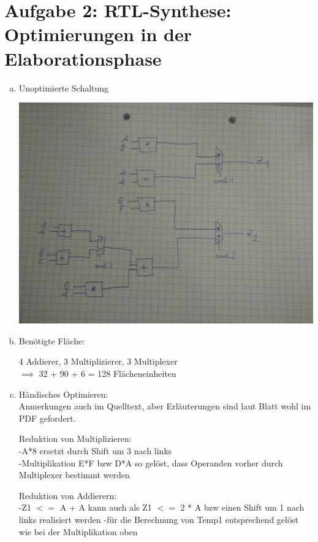 \documentclass[a4paper]{scrartcl}
\begin{document}
	\section*{Aufgabe 2: RTL-Synthese: Optimierungen in der Elaborationsphase}
	
	\begin{enumerate}[(a)]
	\item Unoptimierte Schaltung
	
	\includegraphics[width=\textwidth]{netlist}
	
	\item Benötigte Fläche:
	
	4 Addierer, 3 Multiplizierer, 3 Multiplexer\\
	$\implies$ 32 + 90 + 6 = 128 Flächeneinheiten
	
	\item Händisches Optimieren:\\
	
	Anmerkungen auch im Quelltext, aber Erläuterungen sind laut Blatt wohl im PDF gefordert.
	
	Reduktion von Multiplizieren:\\
	-A*8 ersetzt durch Shift um 3 nach links\\
	-Multiplikation E*F bzw D*A so gelöst, dass Operanden vorher durch Multiplexer bestimmt werden
	
	Reduktion von Addierern:\\
	-Z1 $<=$ A + A kann auch als Z1 $<=$ 2 * A bzw einen Shift um 1 nach links realisiert werden
	-für die Berechnung von Temp1 entsprechend gelöst wie bei der Multiplikation oben
	

\end{enumerate}
\end{document}
